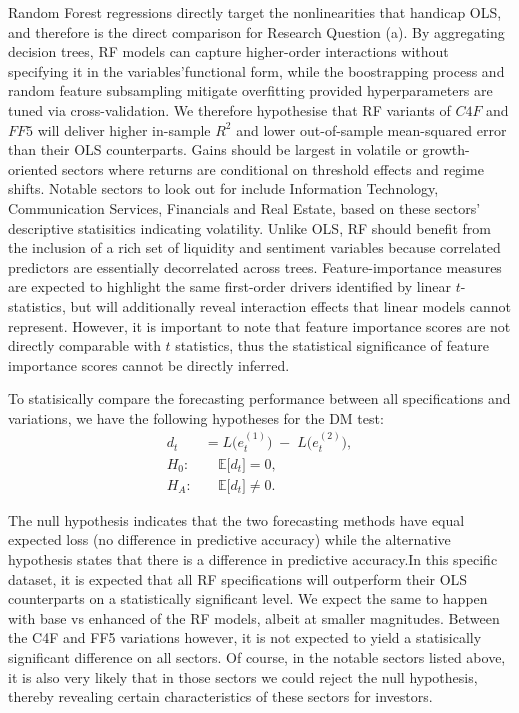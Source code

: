 Random Forest regressions directly target the nonlinearities that handicap OLS, and therefore is the direct comparison for Research Question (a). By aggregating decision trees, RF models can capture higher-order interactions without specifying it in the variables'functional form, while the boostrapping process and random feature subsampling mitigate overfitting provided hyperparameters are tuned via cross-validation. We therefore hypothesise that RF variants of $C4F$ and $FF5$ will deliver higher in-sample $R^{2}$ and lower out-of-sample mean-squared error than their OLS counterparts. Gains should be largest in volatile or growth-oriented sectors where returns are conditional on threshold effects and regime shifts. Notable sectors to look out for include Information Technology, Communication Services, Financials and Real Estate, based on these sectors' descriptive statisitics indicating volatility. Unlike OLS, RF should benefit from the inclusion of a rich set of liquidity and sentiment variables because correlated predictors are essentially decorrelated across trees. Feature-importance measures are expected to highlight the same first-order drivers identified by linear $t$-statistics, but will additionally reveal interaction effects that linear models cannot represent. However, it is important to note that feature importance scores are not directly comparable with $t$ statistics, thus the statistical significance of feature importance scores cannot be directly inferred. 

To statisically compare the forecasting performance between all specifications and variations, we have the following hypotheses for the DM test:
\begin{align}
d_t &= L\bigl(e^{(1)}_t\bigr) \;-\; L\bigl(e^{(2)}_t\bigr), \\[6pt]
H_0: &\quad \mathbb{E}\bigl[d_t\bigr] = 0, \\[4pt]
H_A: &\quad \mathbb{E}\bigl[d_t\bigr] \neq 0.
\end{align}

The null hypothesis indicates that the two forecasting methods have equal expected loss (no difference in predictive accuracy) while the alternative hypothesis states that there is a difference in predictive accuracy.In this specific dataset, it is expected that all RF specifications will outperform their OLS counterparts on a statistically significant level. We expect the same to happen with base vs enhanced of the RF models, albeit at smaller magnitudes. Between the C4F and FF5 variations however, it is not expected to yield a statisically significant difference on all sectors. Of course, in the notable sectors listed above, it is also very likely that in those sectors we could reject the null hypothesis, thereby revealing certain characteristics of these sectors for investors.

